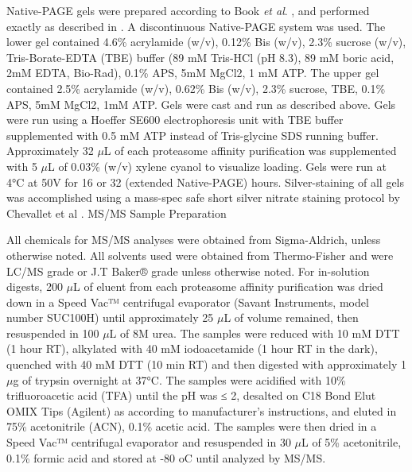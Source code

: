 Native-PAGE gels were prepared according to Book \textit{et al}. \citep{book10}, and performed exactly as described in \citep{marshall17}. A discontinuous Native-PAGE system was used. The lower gel contained 4.6\% acrylamide (w/v), 0.12\% Bis (w/v), 2.3\% sucrose (w/v), Tris-Borate-EDTA (TBE) buffer (89 mM Tris-HCl (pH 8.3), 89 mM boric acid, 2mM EDTA, Bio-Rad), 0.1\% APS, 5mM MgCl2, 1 mM ATP. The upper gel contained 2.5\% acrylamide (w/v), 0.62\% Bis (w/v), 2.3\% sucrose, TBE, 0.1\% APS, 5mM MgCl2, 1mM ATP. Gels were cast and run as described above. Gels were run using a Hoeffer SE600 electrophoresis unit with TBE buffer supplemented with 0.5 mM ATP instead of Tris-glycine SDS running buffer. Approximately 32 $\mu$L of each proteasome affinity purification was supplemented with 5 $\mu$L of 0.03\% (w/v) xylene cyanol to visualize loading. Gels were run at 4°C at 50V for 16 or 32 (extended Native-PAGE) hours. Silver-staining of all gels was accomplished using a mass-spec safe short silver nitrate staining protocol by Chevallet et al \citep{chevallet06}.
MS/MS Sample Preparation

	All chemicals for MS/MS analyses were obtained from Sigma-Aldrich, unless otherwise noted. All solvents used were obtained from Thermo-Fisher and were LC/MS grade or J.T Baker® grade unless otherwise noted. For in-solution digests, 200 $\mu$L of eluent from each proteasome affinity purification was dried down in a Speed Vac™ centrifugal evaporator (Savant Instruments, model number SUC100H) until approximately 25 $\mu$L of volume remained, then resuspended in 100 $\mu$L of 8M urea. The samples were reduced with 10 mM DTT (1 hour RT), alkylated with 40 mM iodoacetamide (1 hour RT in the dark), quenched with 40 mM DTT (10 min RT) and then digested with approximately 1 $\mu$g of trypsin overnight at 37°C. The samples were acidified with 10\% trifluoroacetic acid (TFA) until the pH was ≤ 2, desalted on C18 Bond Elut OMIX Tips (Agilent) as according to manufacturer’s instructions, and eluted in 75\% acetonitrile (ACN), 0.1\% acetic acid. The samples were then dried in a Speed Vac™ centrifugal evaporator and resuspended in 30 $\mu$L of 5\% acetonitrile, 0.1\% formic acid and stored at -80 oC until analyzed by MS/MS. 
	
